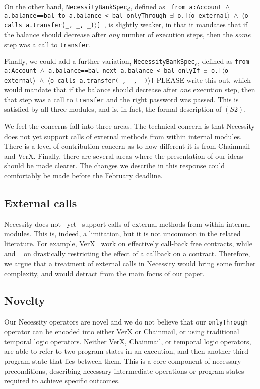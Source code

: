 \documentclass[11pt]{amsart}
\newcommand{\prg}[1]{\texttt{#1}}
\begin{document}
On the other hand,   \prg{NecessityBankSpec}$_d$, defined as 
\texttt{
from a:Account $\wedge$ a.balance==bal to a.balance < bal
onlyThrough $\exists$ o.[$\langle$o external$\rangle$ $\wedge$ $\langle$o calls a.transfer(\_, \_, \_)$\rangle$]
}, is slightly weaker, in that it mandates that if the balance should decrease after \emph{any} number of execution steps, then the \emph{some} step was a call  to \prg{transfer}.  

Finally, we could add a further variation, \prg{NecessityBankSpec}$_e$, defined as 
\texttt{from a:Account $\wedge$ a.balance==bal next a.balance < bal
 onlyIf $\exists$ o.[$\langle$o external$\rangle$ $\wedge$ $\langle$o calls a.transfer(\_, \_, \_)$\rangle$]}
  PLEASE write this out, which would mandate  that if the balance should decrease after \emph{one} execution step, then that step was a call  to \prg{transfer} and the right password was passed. This is satisfied by all three modules, and is, in fact, the formal description of $(S2)$.

We feel the concerns fall into three areas. The technical concern is that Necessity does not yet support calls of external methods from within internal modules. There is a level of contribution concern as to how different it is from Chainmail and VerX. Finally, there are several areas where the presentation of our ideas should be made clearer. The changes we describe in this response could comfortably be made before the February deadline.

\subsection*{External calls}

Necessity does not --yet-- support calls of external methods from within internal modules. This is, indeed, a limitation, but it is not uncommon in the related literature. For example, VerX~\citep{Permenev} work on effectively call-back free contracts, while~\citep{Grossman} and ~\citep{Albert} on drastically restricting the effect of a callback on a contract. Therefore, we argue that a treatment of  external calls in Necessity would bring some further complexity, and would  detract from the main focus of our paper.  

\subsection*{Novelty}

Our Necessity operators are novel and we do not believe that our {\tt{onlyThrough}} operator can be encoded into either VerX or Chainmail, or using traditional temporal logic operators. Neither VerX, Chainmail, or temporal logic operators, are able to refer to two program states in an execution, and then another third program state that lies between them. This is a core component of necessary preconditions, describing necessary intermediate operations or program states required to achieve specific outcomes.
\end{document}
